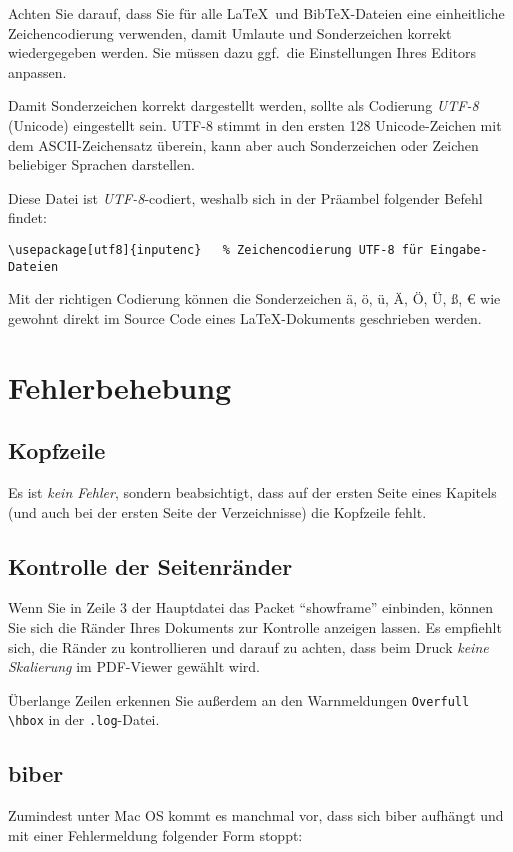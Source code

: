 Achten Sie darauf, dass Sie für alle \LaTeX\ und BibTeX-Dateien eine einheitliche Zeichencodierung verwenden, damit Umlaute und Sonderzeichen korrekt wiedergegeben werden. Sie müssen dazu ggf.\ die Einstellungen Ihres Editors anpassen.

Damit Sonderzeichen korrekt dargestellt werden, sollte als Codierung \emph{UTF-8} (Unicode) eingestellt sein. UTF-8 stimmt in den ersten 128 Unicode-Zeichen mit dem ASCII-Zeichensatz überein, kann aber auch Sonderzeichen oder Zeichen beliebiger Sprachen darstellen.

Diese Datei ist \emph{UTF-8}-codiert, weshalb sich in der Präambel folgender Befehl findet:
\lstset{language=TeX} 
\begin{lstlisting}
\usepackage[utf8]{inputenc}   % Zeichencodierung UTF-8 für Eingabe-Dateien
\end{lstlisting}

Mit der richtigen Codierung können die Sonderzeichen ä, ö, ü, Ä, Ö, Ü, ß, € wie gewohnt direkt im Source Code eines \LaTeX-Dokuments geschrieben werden.

\section{Fehlerbehebung}\label{section:fehlerbehebung}

\subsection{Kopfzeile}
Es ist \emph{kein Fehler}, sondern beabsichtigt, dass auf der ersten Seite eines Kapitels (und auch bei der ersten Seite der Verzeichnisse) die Kopfzeile fehlt.

\subsection{Kontrolle der Seitenränder}
Wenn Sie in Zeile 3 der Hauptdatei das Packet \enquote{showframe} einbinden, können Sie sich die Ränder Ihres Dokuments zur Kontrolle anzeigen lassen. Es empfiehlt sich, die Ränder zu kontrollieren und darauf zu achten, dass beim Druck \emph{keine Skalierung} im PDF-Viewer gewählt wird.  

Überlange Zeilen erkennen Sie außerdem an den Warnmeldungen \verb|Overfull \hbox| in der \verb|.log|-Datei.

\subsection{biber}
Zumindest unter Mac OS kommt es manchmal vor, dass sich biber aufhängt und mit einer Fehlermeldung folgender Form stoppt:

